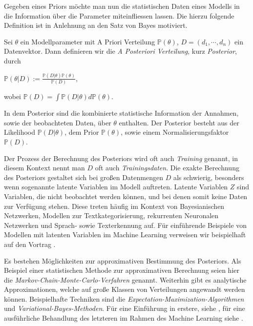 Gegeben eines Priors möchte man nun die statistischen Daten eines Modells in die Information über die Parameter miteinfliessen lassen. Die hierzu folgende Definition ist in Anlehnung an den Satz von Bayes motiviert.

\begin{defi}
	Sei $\theta$ ein Modellparameter mit A Priori Verteilung $\mathbb{P}(\theta)$, $D = 		(d_1, \cdots, d_n)$ ein Datenvektor. Dann definieren wir die \textit{A Posteriori 			Verteilung}, kurz \textit{Posterior}, durch
	\begin{center}
		$\mathbb{P}(\theta \vert D) := \frac{\mathbb{P}(D \vert \theta) 
		\mathbb{P}(\theta)}{\mathbb{P}(D)}$,
	\end{center}
	wobei $\mathbb{P}(D) = \int \mathbb{P}(D \vert \theta) d\mathbb{P}(\theta)$.
\end{defi}

In dem Posterior sind die kombinierte statistische Information der Annahmen, sowie der beobachteten Daten, über $\theta$ enthalten. Der Posterior besteht aus der Likelihood $\mathbb{P}(D\vert \theta)$, dem Prior $\mathbb{P}(\theta)$, sowie einem Normalisierungsfaktor $\mathbb{P}(D)$. 

Der Prozess der Berechnung des Posteriors wird oft auch \textit{Training} genannt, in diesem Kontext nennt man $D$ oft auch \textit{Trainingsdaten}. Die exakte Berechnung des Posteriors gestaltet sich bei großen Datenmengen $D$ als schwierig, besonders wenn sogenannte latente Variablen im Modell auftreten. Latente Variablen $Z$ sind Variablen, die nicht beobachtet werden können, und bei denen somit keine Daten zur Verfügung stehen. Diese treten häufig im Kontext von Bayesianischen Netzwerken, Modellen zur Textkategorisierung, rekurrenten Neuronalen Netzwerken und Sprach- sowie Texterkennung auf. Für einführende Beispiele von Modellen mit latenten Variablen im Machine Learning verweisen wir beispielhaft auf den Vortrag \cite{Latent_Variables}. 

Es bestehen Möglichkeiten zur approximativen Bestimmung des Posteriors. Als Beispiel einer statistischen Methode zur approximativen Berechnung seien hier die \textit{Markov-Chain-Monte-Carlo-Verfahren} genannt. Weiterhin gibt es analytische Approximationen, welche auf große Klassen von Verteilungen angewandt werden können. Beispielhafte Techniken sind die \textit{Expectation-Maximization-Algorithmen} und \textit{Variational-Bayes-Methoden}. Für eine Einführung in erstere, siehe \cite{Exp_Max}, für eine ausführliche Behandlung des letzteren im Rahmen des Machine Learning siehe \cite{Var_Bayes}. 


